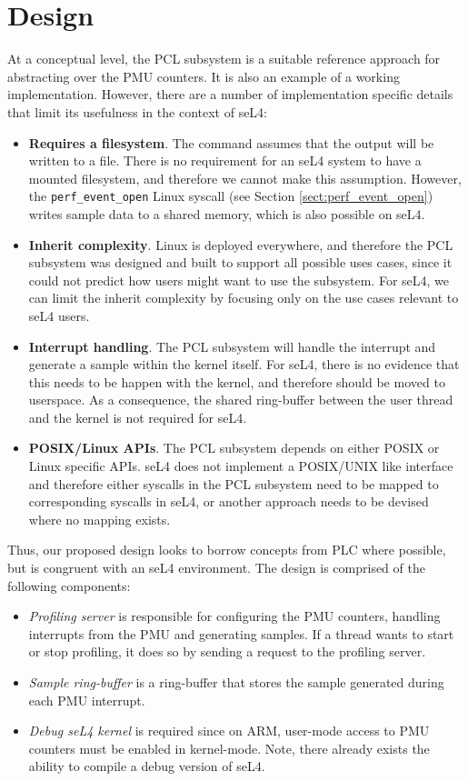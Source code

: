 \section{Design}

At a conceptual level, the PCL subsystem is a suitable reference approach for abstracting over the PMU counters. It is also an example of a working implementation. However, there are a number of implementation specific details that limit its usefulness in the context of seL4:

\ssp\begin{itemize}
    \item \textbf{Requires a filesystem}. The  command assumes that the output will be written to a file. There is no requirement for an seL4 system to have a mounted filesystem, and therefore we cannot make this assumption. However, the \texttt{perf\_event\_open} Linux syscall (see Section \ref{sect:perf_event_open}) writes sample data to a shared memory, which is also possible on seL4.
    \item \textbf{Inherit complexity}. Linux is deployed everywhere, and therefore the PCL subsystem was designed and built to support all possible uses cases, since it could not predict how users might want to use the subsystem. For seL4, we can limit the inherit complexity by focusing only on the use cases relevant to seL4 users.
    \item \textbf{Interrupt handling}. The PCL subsystem will handle the interrupt and generate a sample within the kernel itself. For seL4, there is no evidence that this needs to be happen with the kernel, and therefore should be moved to userspace. As a consequence, the shared ring-buffer between the user thread and the kernel is not required for seL4.
    \item \textbf{POSIX/Linux APIs}. The PCL subsystem depends on either POSIX or Linux specific APIs. seL4 does not implement a POSIX/UNIX like interface and therefore either syscalls in the PCL subsystem need to be mapped to corresponding syscalls in seL4, or another approach needs to be devised where no mapping exists.
\end{itemize}\dsp

Thus, our proposed design looks to borrow concepts from PLC where possible, but is congruent with an seL4 environment. The design is comprised of the following components:

\ssp\begin{itemize}
    \item \textit{Profiling server} is responsible for configuring the PMU counters, handling interrupts from the PMU and generating samples. If a thread wants to start or stop profiling, it does so by sending a request to the profiling server.
    \item \textit{Sample ring-buffer} is a ring-buffer that stores the sample generated during each PMU interrupt.
    \item \textit{Debug seL4 kernel} is required since on ARM, user-mode access to PMU counters must be enabled in kernel-mode. Note, there already exists the ability to compile a debug version of seL4.
\end{itemize}\dsp

